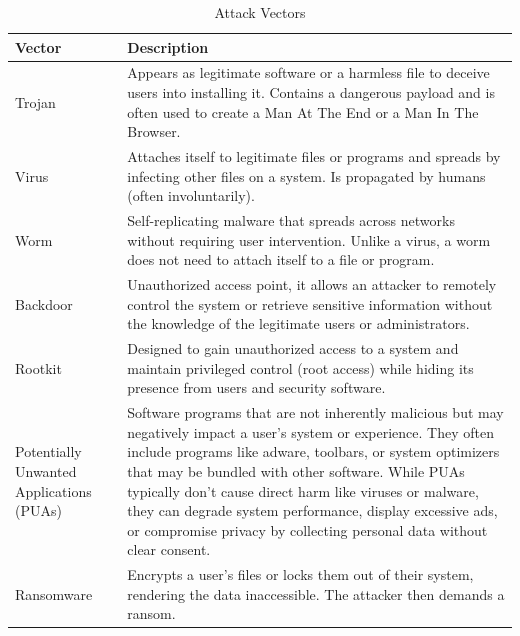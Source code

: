 \begin{table}[H]
    \centering
    \begin{tabular}{|p{3cm}|p{12cm}|}\hline
    \rowcolor{blue!10}
    \textbf{Vector} 
        & \textbf{Description}  
    \\ \hline

    Trojan
        & Appears as legitimate software or a harmless file to deceive users into installing it. Contains a dangerous payload and is often used to create a Man At The End or a Man In The Browser.
    \\ \hline
    
    Virus
        & Attaches itself to legitimate files or programs and spreads by infecting other files on a system. Is propagated by humans (often involuntarily).
    \\ \hline

    Worm
        & Self-replicating malware that spreads across networks without requiring user intervention. Unlike a virus, a worm does not need to attach itself to a file or program.
    \\ \hline

    Backdoor
        & Unauthorized access point, it allows an attacker to remotely control the system or retrieve sensitive information without the knowledge of the legitimate users or administrators.
    \\ \hline

    Rootkit
        & Designed to gain unauthorized access to a system and maintain privileged control (root access) while hiding its presence from users and security software.
    \\ \hline

    Potentially Unwanted Applications (PUAs)
        & Software programs that are not inherently malicious but may negatively impact a user’s system or experience. They often include programs like adware, toolbars, or system optimizers that may be bundled with other software. While PUAs typically don’t cause direct harm like viruses or malware, they can degrade system performance, display excessive ads, or compromise privacy by collecting personal data without clear consent. 
    \\ \hline

    Ransomware 
        & Encrypts a user’s files or locks them out of their system, rendering the data inaccessible. The attacker then demands a ransom.
    \\ \hline



\end{tabular}
\caption{Attack Vectors}
\label{tab:attackVectors}
\end{table}